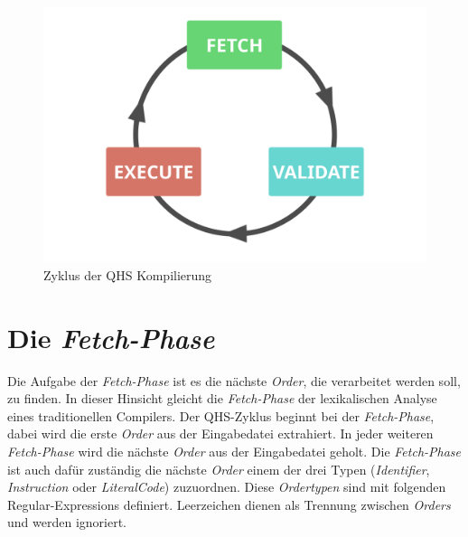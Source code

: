 \begin{figure}[h!]
    \centering
    \includegraphics[scale=0.6]{resources/images/qhs-cycle.png}
    \caption{Zyklus der QHS Kompilierung}
    \label{fig:qhs-cycle}
\end{figure}

\section{Die \textit{Fetch-Phase}} \label{sec:qhs-fetch}
Die Aufgabe der \textit{Fetch-Phase} ist es die nächste \textit{Order}, die verarbeitet werden soll, zu finden. In dieser Hinsicht gleicht die \textit{Fetch-Phase} der lexikalischen Analyse eines traditionellen Compilers.
Der QHS-Zyklus beginnt bei der \textit{Fetch-Phase}, dabei wird die erste \textit{Order} aus der Eingabedatei extrahiert. In jeder weiteren \textit{Fetch-Phase} wird die nächste \textit{Order} aus der Eingabedatei geholt.
Die \textit{Fetch-Phase} ist auch dafür zuständig die nächste \textit{Order} einem der drei Typen (\textit{Identifier}, \textit{Instruction} oder \textit{LiteralCode}) zuzuordnen.
Diese \textit{Ordertypen} sind mit folgenden Regular-Expressions definiert. Leerzeichen dienen als Trennung zwischen \textit{Orders} und werden ignoriert.

